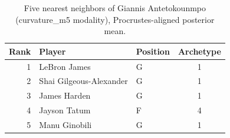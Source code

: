 \begin{table}[htbp]
  \centering\small
  \begin{tabular}{rllc}
    \toprule
    Rank & Player & Position & Archetype \\
    \midrule
    1 & LeBron James & G & 1 \\
    2 & Shai Gilgeous-Alexander & G & 1 \\
    3 & James Harden & G & 1 \\
    4 & Jayson Tatum & F & 4 \\
    5 & Manu Ginobili & G & 1 \\
    \bottomrule
  \end{tabular}
  \caption{Five nearest neighbors of Giannis Antetokounmpo (curvature_m5 modality), Procrustes-aligned posterior mean.}
  \label{tab:Giannis_Antetokounmpo_neighbors_curvature_m5}
\end{table}

